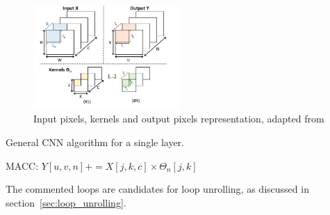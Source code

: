 \begin{figure}[!htb]
	\centering
	\includegraphics[width=0.5\textwidth]{Figures/data_representation.png}
	\caption[Caption for figure in TOC.]{Input pixels, kernels and output pixels representation, adapted from \cite{hal:accelCNNonFPGA}}
	\label{fig:data_representation}
\end{figure}

\begin{algorithm}
	\caption{General CNN algorithm for a single layer.}
	\label{alg:general_CNN}
	\begin{algorithmic}
		\STATE MACC: $Y[u, v, n] += X[j, k, c] \times \Theta_n [j, k] $
		\ENDFOR
		\ENDFOR
		\ENDFOR
		\ENDFOR
		\ENDFOR
		\ENDFOR	
	\end{algorithmic}
\end{algorithm}

The commented loops are candidates for loop unrolling, as discussed in section~\ref{sec:loop_unrolling}.


